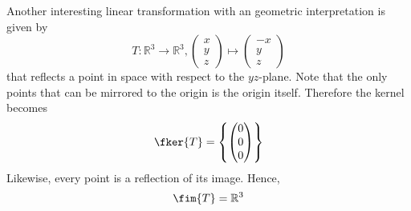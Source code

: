 \begin{exm}\label{exm-linear-map-yz-reflection}
	Another interesting linear transformation with an geometric interpretation
	is given by
	\begin{equation}
		T:\mathbb{R}^3\to\mathbb{R}^3,
		\begin{pmatrix}
			x \\ y \\ z
		\end{pmatrix}\mapsto
		\begin{pmatrix}
			-x \\ y \\ z
		\end{pmatrix}
	\end{equation}
	that reflects a point in space with respect to the $yz$-plane. Note that the
	only points that can be mirrored to the origin is the origin itself. Therefore
	the kernel becomes
	\begin{equation*}
		\fker{T}=\left\{\begin{pmatrix}
			0 \\ 0 \\ 0
		\end{pmatrix}\right\}
	\end{equation*}
	Likewise, every point is a reflection of its image. Hence,
	\begin{equation*}
		\fim{T}=\mathbb{R}^3
	\end{equation*}
\end{exm}

